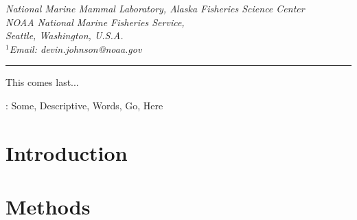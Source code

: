 \documentclass[fleqn]{article}
\begin{document}
\renewcommand{\baselinestretch}{1.5}\normalsize

\bigskip

\renewcommand{\baselinestretch}{1}\normalsize

\bigskip

{
\itshape{\noindent National Marine Mammal Laboratory, Alaska Fisheries Science Center\\
NOAA National Marine Fisheries Service,\\
Seattle, Washington, U.S.A.\medskip \\
$^1${\em Email:} devin.johnson@noaa.gov
}
\bigskip 
\hrule
\bigskip
}


\raggedbottom



This comes last...

: Some, Descriptive, Words, Go, Here\medskip



\renewcommand{\baselinestretch}{1.8}\normalsize
\linenumbers

\section{Introduction}


\section{Methods}
\end{document}
